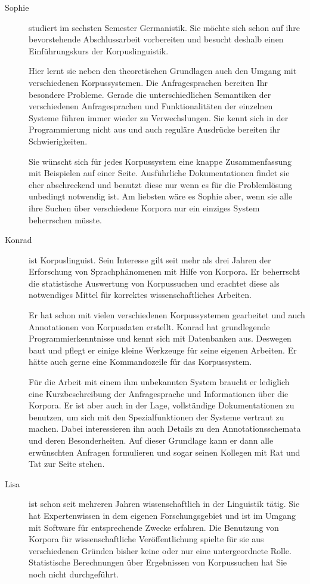 \newpage
\begin{description}
	
	\item[Sophie] {
		studiert im sechsten Semester Germanistik. Sie möchte sich schon auf ihre bevorstehende Abschlussarbeit vorbereiten und besucht deshalb einen Einführungskurs der Korpuslinguistik.
		
		Hier lernt sie neben den theoretischen Grundlagen auch den Umgang mit verschiedenen Korpussystemen. Die Anfragesprachen bereiten Ihr besondere Probleme. Gerade die unterschiedlichen Semantiken der verschiedenen Anfragesprachen und Funktionalitäten der einzelnen Systeme führen immer wieder zu Verwechslungen. Sie kennt sich in der Programmierung nicht aus und auch reguläre Ausdrücke bereiten ihr Schwierigkeiten.
		
		Sie wünscht sich für jedes Korpussystem eine knappe Zusammenfassung mit Beispielen auf einer Seite. Ausführliche Dokumentationen findet sie eher abschreckend und benutzt diese nur wenn es für die Problemlösung unbedingt notwendig ist. Am liebsten wäre es Sophie aber, wenn sie alle ihre Suchen über verschiedene Korpora nur ein einziges System beherrschen müsste.
	}
	
	\item[Konrad] { ist Korpuslinguist. Sein Interesse gilt seit mehr als drei Jahren der Erforschung von Sprachphänomenen mit Hilfe von Korpora. Er beherrscht die statistische Auswertung von Korpussuchen und erachtet diese als notwendiges Mittel für korrektes wissenschaftliches Arbeiten.
		
		Er hat schon mit vielen verschiedenen Korpussystemen gearbeitet und auch Annotationen von Korpusdaten erstellt. Konrad hat grundlegende Programmierkenntnisse und kennt sich mit Datenbanken aus. Deswegen baut und pflegt er einige kleine Werkzeuge für seine eigenen Arbeiten. Er hätte auch gerne eine Kommandozeile für das Korpussystem.
		
		Für die Arbeit mit einem ihm unbekannten System braucht er lediglich eine Kurzbeschreibung der Anfragesprache und Informationen über die Korpora. Er ist aber auch in der Lage, vollständige Dokumentationen zu benutzen, um sich mit den Spezialfunktionen der Systeme vertraut zu machen. Dabei interessieren ihn auch Details zu den Annotationsschemata und deren Besonderheiten. Auf dieser Grundlage kann er dann alle erwünschten Anfragen formulieren und sogar seinen Kollegen mit Rat und Tat zur Seite stehen.
	}

	\item[Lisa] {
		ist schon seit mehreren Jahren wissenschaftlich in der Linguistik tätig. Sie hat Expertenwissen in dem eigenen Forschungsgebiet und ist im Umgang mit Software für entsprechende Zwecke erfahren. Die Benutzung von Korpora für wissenschaftliche Veröffentlichung spielte für sie aus verschiedenen Gründen bisher keine oder nur eine untergeordnete Rolle. Statistische Berechnungen über Ergebnissen von Korpussuchen hat Sie noch nicht durchgeführt.
		
}
\end{description}
